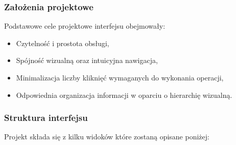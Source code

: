 \subsubsection{Założenia projektowe}
Podstawowe cele projektowe interfejsu obejmowały:
\begin{itemize}
    \item Czytelność i prostota obsługi,
    \item Spójność wizualną oraz intuicyjna nawigacja,
    \item Minimalizacja liczby kliknięć wymaganych do wykonania operacji,
    \item Odpowiednia organizacja informacji w oparciu o hierarchię wizualną.
\end{itemize}

\subsubsection{Struktura interfejsu}
Projekt składa się z kilku widoków które zostaną opisane poniżej:
